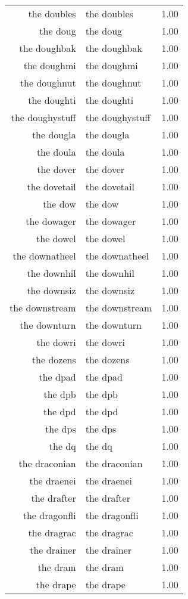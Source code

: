 \begin{table}[ht]
\begin{tabular}{rlr}
  the doubles & the doubles & 1.00 \\ 
  the doug & the doug & 1.00 \\ 
  the doughbak & the doughbak & 1.00 \\ 
  the doughmi & the doughmi & 1.00 \\ 
  the doughnut & the doughnut & 1.00 \\ 
  the doughti & the doughti & 1.00 \\ 
  the doughystuff & the doughystuff & 1.00 \\ 
  the dougla & the dougla & 1.00 \\ 
  the doula & the doula & 1.00 \\ 
  the dover & the dover & 1.00 \\ 
  the dovetail & the dovetail & 1.00 \\ 
  the dow & the dow & 1.00 \\ 
  the dowager & the dowager & 1.00 \\ 
  the dowel & the dowel & 1.00 \\ 
  the downatheel & the downatheel & 1.00 \\ 
  the downhil & the downhil & 1.00 \\ 
  the downsiz & the downsiz & 1.00 \\ 
  the downstream & the downstream & 1.00 \\ 
  the downturn & the downturn & 1.00 \\ 
  the dowri & the dowri & 1.00 \\ 
  the dozens & the dozens & 1.00 \\ 
  the dpad & the dpad & 1.00 \\ 
  the dpb & the dpb & 1.00 \\ 
  the dpd & the dpd & 1.00 \\ 
  the dps & the dps & 1.00 \\ 
  the dq & the dq & 1.00 \\ 
  the draconian & the draconian & 1.00 \\ 
  the draenei & the draenei & 1.00 \\ 
  the drafter & the drafter & 1.00 \\ 
  the dragonfli & the dragonfli & 1.00 \\ 
  the dragrac & the dragrac & 1.00 \\ 
  the drainer & the drainer & 1.00 \\ 
  the dram & the dram & 1.00 \\ 
  the drape & the drape & 1.00 \\ 

\end{tabular}
\end{table}
